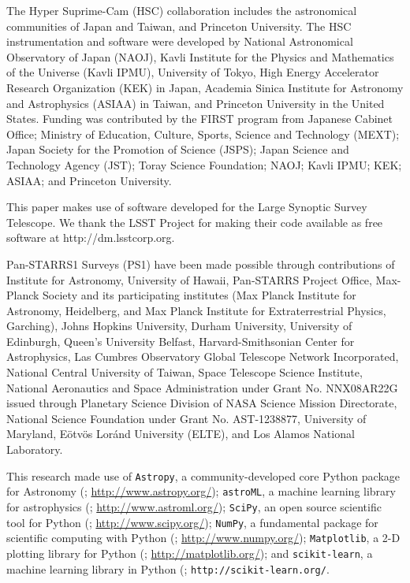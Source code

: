 \documentclass[useamsfonts]{pasj01}
\begin{document}
\begin{ack}
    \label{sec:ack}

    The Hyper Suprime-Cam (HSC) collaboration includes the astronomical communities of
    Japan and Taiwan, and Princeton University.
    The HSC instrumentation and software were developed by National Astronomical
    Observatory of Japan (NAOJ), Kavli Institute for the Physics and Mathematics of
    the Universe (Kavli IPMU), University of Tokyo, High Energy Accelerator
    Research Organization (KEK) in Japan,  Academia Sinica Institute for Astronomy and
    Astrophysics  (ASIAA) in Taiwan, and Princeton University in the United States.
    Funding was contributed by the FIRST program from Japanese Cabinet Office; Ministry of Education, Culture, Sports, Science and Technology (MEXT); Japan
    Society for the Promotion of Science (JSPS); Japan Science and Technology Agency
    (JST); Toray Science  Foundation; NAOJ; Kavli IPMU; KEK; ASIAA; and Princeton University.

    This paper makes use of software developed for the Large Synoptic Survey Telescope.
    We thank the LSST Project for making their code available as free software at
    http://dm.lsstcorp.org.

    Pan-STARRS1 Surveys (PS1) have been made possible through contributions of
    Institute for Astronomy, University of Hawaii, Pan-STARRS Project Office,
    Max-Planck Society and its participating institutes (Max Planck Institute
    for Astronomy, Heidelberg, and Max Planck Institute for Extraterrestrial Physics,
    Garching), Johns Hopkins University, Durham University, University of
    Edinburgh, Queen's University Belfast, Harvard-Smithsonian Center for Astrophysics,
    Las Cumbres Observatory Global Telescope Network Incorporated,  National
    Central University of Taiwan, Space Telescope Science Institute,  National
    Aeronautics and Space Administration under Grant No.
    NNX08AR22G issued through Planetary Science Division of NASA Science
    Mission Directorate, National Science Foundation under Grant No. AST-1238877,
    University of Maryland, Eötvös Loránd University (ELTE), and Los Alamos
    National Laboratory.

    This research made use of
    {\texttt{Astropy}},
        a community-developed core Python package for Astronomy (\citealt{Astropy};
        \url{http://www.astropy.org/});
    {\texttt{astroML}},
        a machine learning library for astrophysics (\citealt{astroml};
        \url{http://www.astroml.org/});
    {\texttt{SciPy}},
        an open source scientific tool for Python (\citealt{SciPy};
        \url{http://www.scipy.org/});
    {\texttt{NumPy}},
        a fundamental package for scientific computing with Python (\citealt{NumPy};
        \url{http://www.numpy.org/});
    {\texttt{Matplotlib}},
        a 2-D plotting library for Python (\citealt{Matplotlib};
        \url{http://matplotlib.org/}); and
    {\texttt{scikit-learn}},
        a machine learning library in Python (\citealt{scikit-learn};
        \texttt{http://scikit-learn.org/}.

\end{ack}
\end{document}
